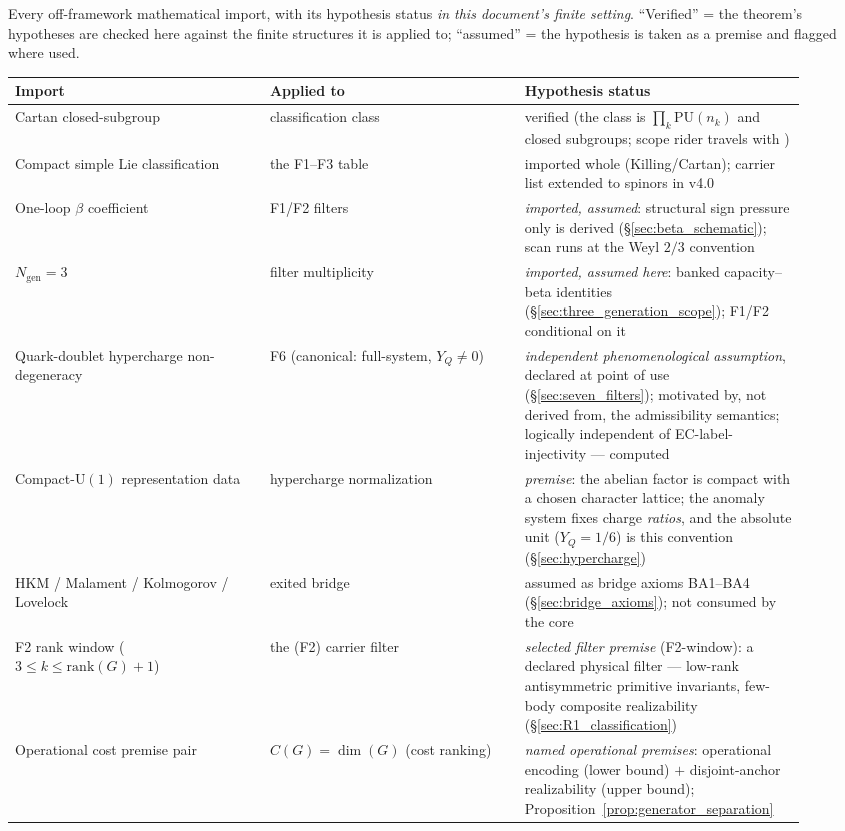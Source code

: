 \documentclass[11pt]{article}
\theoremstyle{definition}
\newcommand{\U}{\mathrm{U}}
\newcommand{\codeid}[1]{\texttt{\seqsplit{#1}}}%
\begin{document}
\begin{tcolorbox}[apfbox, title={Imported-ingredient hypothesis ledger (verified vs.\ assumed in the finite-cost environment)}]
\footnotesize
Every off-framework mathematical import, with its hypothesis status
\emph{in this document's finite setting}.  ``Verified'' = the theorem's
hypotheses are checked here against the finite structures it is applied
to; ``assumed'' = the hypothesis is taken as a premise and flagged where
used.

\smallskip
\begin{tabular}{@{}p{0.30\linewidth}p{0.30\linewidth}p{0.32\linewidth}@{}}
\toprule
\textbf{Import} & \textbf{Applied to} & \textbf{Hypothesis status} \\
\midrule
Cartan closed-subgroup & classification class & verified (the class is $\prod_k \mathrm{PU}(n_k)$ and closed subgroups; scope rider travels with \codeid{check\_L\_cost\_gauge}) \\
Compact simple Lie classification & the F1--F3 table & imported whole (Killing/Cartan); carrier list extended to spinors in v4.0 \\
One-loop $\beta$ coefficient & F1/F2 filters & \emph{imported, assumed}: structural sign pressure only is derived (\S\ref{sec:beta_schematic}); scan runs at the Weyl $2/3$ convention \\
$N_{\mathrm{gen}} = 3$ & filter multiplicity & \emph{imported, assumed here}: banked capacity--beta identities (\S\ref{sec:three_generation_scope}); F1/F2 conditional on it \\
Quark-doublet hypercharge non-degeneracy & F6 (canonical: full-system, $Y_Q \neq 0$) & \emph{independent phenomenological assumption}, declared at point of use (\S\ref{sec:seven_filters}); motivated by, not derived from, the admissibility semantics; logically independent of EC-label-injectivity --- computed \\
Compact-$\U(1)$ representation data & hypercharge normalization & \emph{premise}: the abelian factor is compact with a chosen character lattice; the anomaly system fixes charge \emph{ratios}, and the absolute unit ($Y_Q = 1/6$) is this convention (\S\ref{sec:hypercharge}) \\
HKM / Malament / Kolmogorov / Lovelock & exited bridge & assumed as bridge axioms BA1--BA4 (\S\ref{sec:bridge_axioms}); not consumed by the core \\
F2 rank window ($3 \le k \le \mathrm{rank}(G){+}1$) & the (F2) carrier filter & \emph{selected filter premise} (F2-window): a declared physical filter --- low-rank antisymmetric primitive invariants, few-body composite realizability (\S\ref{sec:R1_classification}) \\
Operational cost premise pair & $C(G) = \dim(G)$ (cost ranking) & \emph{named operational premises}: operational encoding (lower bound) $+$ disjoint-anchor realizability (upper bound); Proposition~\ref{prop:generator_separation} \\
\bottomrule
\end{tabular}
\end{tcolorbox}
\end{document}
